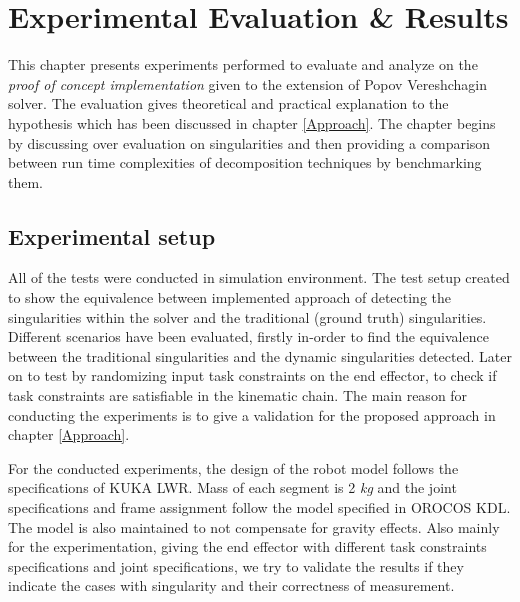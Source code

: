 \chapter{Experimental Evaluation \& Results}
\label{ER}
This chapter presents experiments performed to evaluate and analyze on the \textit{proof of concept implementation} given to the extension of Popov Vereshchagin solver. The evaluation gives theoretical and practical explanation to the hypothesis which has been discussed in chapter \ref{Approach}. The chapter begins by discussing over evaluation on singularities and then providing a comparison between  run time complexities of decomposition techniques by benchmarking them.
\section{Experimental setup}
All of the tests were conducted in simulation environment. The test setup created to show the equivalence between implemented approach of detecting the singularities within the solver and the traditional (ground truth) singularities. Different scenarios have been evaluated, firstly in-order to find the equivalence between the traditional singularities and the dynamic singularities detected. Later on to test by randomizing input task constraints on the end effector, to check if task constraints are satisfiable in the kinematic chain. The main reason for conducting the experiments is to give a validation for the proposed approach in chapter \ref{Approach}.


For the conducted experiments, the design of the robot model follows the specifications of KUKA LWR. Mass of each segment is 2 \textit{kg} and the joint specifications and frame assignment follow the model specified in OROCOS KDL. The model is also maintained to not compensate for gravity effects. Also mainly for the experimentation, giving the end effector with different task constraints specifications and joint specifications, we try to validate the results if they indicate the cases with singularity and their correctness of measurement. 
